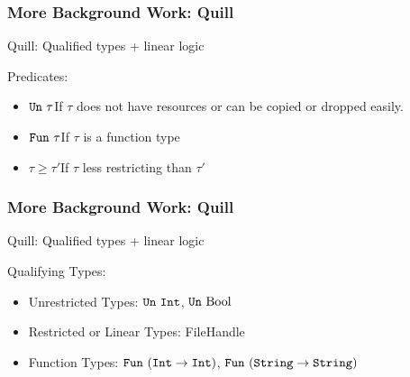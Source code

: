 \begin{frame}
  \frametitle{More Background Work: Quill}
  \begin{center}
    Quill\citep{morris_best_2016}: {\color{blue}Qu}al{\color{blue}i}fied types + {\color{blue}l}inear {\color{blue}l}ogic\\
  \end{center}
  Predicates:
  \begin{itemize}
  \item $\texttt{Un}\ \tau$\quad If $\tau$ does not have resources
    or can be copied or dropped easily.
  \item $\texttt{Fun}\ \tau$\quad If $\tau$ is a function type
  \item $\tau \geq \tau'$\quad If $\tau$ less restricting than $\tau'$
  \end{itemize}
\end{frame}

\begin{frame}[fragile, c]
  \frametitle{More Background Work: Quill}
  \begin{center}
    Quill\citep{morris_best_2016}: {\color{blue}Qu}al{\color{blue}i}fied types + {\color{blue}l}inear {\color{blue}l}ogic\\
  \end{center}
  Qualifying Types:
  \begin{itemize}
  \item Unrestricted Types: $\texttt{Un}\ \texttt{Int}$, $\texttt{Un}\ \text{Bool}$
  \item Restricted or Linear Types: FileHandle
  \item Function Types: $\texttt{Fun}\ (\texttt{Int} \rightarrow \texttt{Int})$,
    $\texttt{Fun}\ (\texttt{String} \rightarrow \texttt{String})$
  \end{itemize}
\end{frame}

